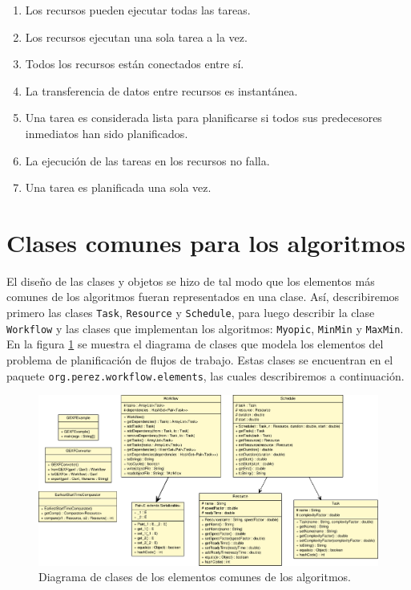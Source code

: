 \begin{enumerate}
\item Los recursos pueden ejecutar todas las tareas.
\item Los recursos ejecutan una sola tarea a la vez.
\item Todos los recursos están conectados entre sí.
\item La transferencia de datos entre recursos es instantánea.
\item Una tarea es considerada lista para planificarse si todos sus predecesores inmediatos han sido planificados.
\item La ejecución de las tareas en los recursos no falla.
\item Una tarea es planificada una sola vez.
\end{enumerate}

\section{Clases comunes para los algoritmos}
El diseño de las clases y objetos se hizo de tal modo que los elementos más comunes de los algoritmos fueran representados en una clase. Así, describiremos primero las clases \texttt{Task}, \texttt{Resource} y \texttt{Schedule}, para luego describir la clase \texttt{Workflow} y las clases que implementan los algoritmos: \texttt{Myopic}, \texttt{MinMin} y \texttt{MaxMin}. En la figura \ref{fig:uml_class} se muestra el diagrama de clases que modela los elementos del problema de planificación de flujos de trabajo. Estas clases se encuentran en el paquete \texttt{org.perez.workflow.elements}, las cuales describiremos a continuación.

\begin{figure}
\begin{center}
\includegraphics[width=1.2\textwidth,angle=90]{imagenes/elements_uml.pdf}
\end{center}
\label{fig:uml_class}
\caption{Diagrama de clases de los elementos comunes de los algoritmos.}
\end{figure}

